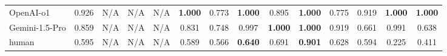 \begin{tabular}{
    @{}lllllccccccccc@{}
    }
    \cmidrule{1-14}
    OpenAI-o1      & 0.926                       & N/A                             & N/A                          & N/A                               & \textbf{1.000} & 0.773                                   & \textbf{1.000}            & 0.895                     & \textbf{1.000}                           & 0.775                      & 0.919                      & \textbf{1.000} & \textbf{1.000} \\
    Gemini-1.5-Pro & 0.859                       & N/A                             & N/A                          & N/A                               & 0.831          & 0.748                                   & 0.997                     & \textbf{1.000}            & \textbf{1.000}                           & 0.919                      & 0.661                      & 0.991          & 0.638          \\
    \cmidrule{1-14}
    human          & 0.595                       & N/A                             & N/A                          & N/A                               & 0.589          & 0.566                                   & \textbf{0.640}            & 0.691                     & \textbf{0.901}                           & 0.628                      & 0.594                      & 0.225          & 0.411          \\
    \bottomrule
\end{tabular}

